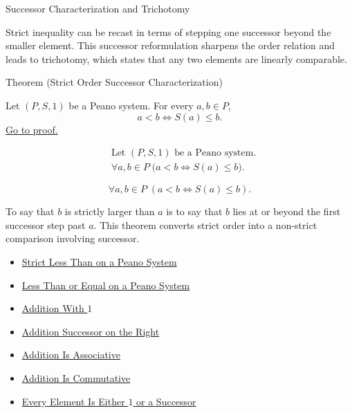 \begin{topicbox}{Successor Characterization and Trichotomy}
\begin{exposition}
Strict inequality can be recast in terms of stepping one successor beyond the
smaller element. This successor reformulation sharpens the order relation and
leads to trichotomy, which states that any two elements are linearly
comparable.
\end{exposition}

\begin{theorembox}{Theorem (Strict Order Successor Characterization)}
\begin{theorem}
\label{thm:strict-order-successor-characterization}
Let $(P,S,1)$ be a Peano system. For every $a,b \in P$,
\[
a<b
\Longleftrightarrow
S(a) \le b.
\]
\hyperref[prf:strict-order-successor-characterization]{Go to proof.}
\end{theorem}
\end{theorembox}

\begin{remark*}
\[
\begin{aligned}
&\text{Let } (P,S,1) \text{ be a Peano system.}\\
&\forall a,b \in P\;
\bigl(a<b \Longleftrightarrow S(a) \le b\bigr).
\end{aligned}
\]
\end{remark*}

\begin{remark*}
\[
\forall a,b \in P\;(a<b \Longleftrightarrow S(a) \le b).
\]
\end{remark*}

\begin{remark*}[Interpretation]
To say that $b$ is strictly larger than $a$ is to say that $b$ lies at or
beyond the first successor step past $a$. This theorem converts strict order
into a non-strict comparison involving successor.
\end{remark*}

\begin{dependencies}
\begin{itemize}
  \item \hyperref[def:strict-less-than-on-peano-system]{Strict Less Than on a Peano System}
  \item \hyperref[def:less-than-or-equal-on-peano-system]{Less Than or Equal on a Peano System}
  \item \hyperref[thm:addition-with-one]{Addition With $1$}
  \item \hyperref[thm:addition-successor-on-right]{Addition Successor on the Right}
  \item \hyperref[thm:addition-associative]{Addition Is Associative}
  \item \hyperref[thm:addition-commutative]{Addition Is Commutative}
  \item \hyperref[thm:every-element-is-one-or-a-successor]{Every Element Is Either $1$ or a Successor}
\end{itemize}
\end{dependencies}


\end{topicbox}
